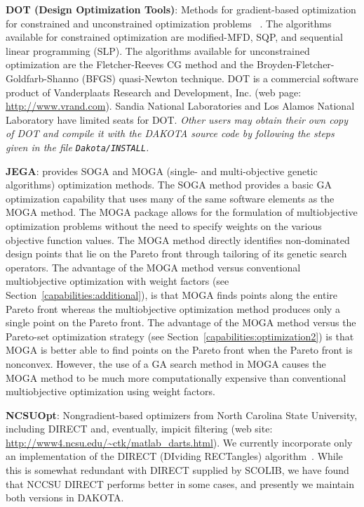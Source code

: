 \textbf{DOT (Design Optimization Tools)}: Methods for gradient-based
optimization for constrained and unconstrained optimization problems
~\cite{Van95}. The algorithms available for constrained optimization are
modified-MFD, SQP, and sequential linear programming (SLP). The
algorithms available for unconstrained optimization are the
Fletcher-Reeves CG method and the Broyden-Fletcher-Goldfarb-Shanno
(BFGS) quasi-Newton technique. DOT is a commercial software product of
Vanderplaats Research and Development, Inc. (web page:
\url{http://www.vrand.com}). Sandia National Laboratories and Los
Alamos National Laboratory have limited seats for DOT. \emph{Other
users may obtain their own copy of DOT and compile it with the DAKOTA
source code by following the steps given in the file {\tt Dakota/INSTALL}.}

\textbf{JEGA}: provides SOGA and MOGA (single- and multi-objective
genetic algorithms) optimization methods. The SOGA method provides a
basic GA optimization capability that uses many of the same software
elements as the MOGA method. The MOGA package allows for the
formulation of multiobjective optimization problems without the need
to specify weights on the various objective function values. The MOGA
method directly identifies non-dominated design points that lie on the
Pareto front through tailoring of its genetic search operators.  The
advantage of the MOGA method versus conventional multiobjective
optimization with weight factors (see
Section~\ref{capabilities:additional}), is that MOGA finds points
along the entire Pareto front whereas the multiobjective optimization
method produces only a single point on the Pareto front. The advantage
of the MOGA method versus the Pareto-set optimization strategy (see
Section~\ref{capabilities:optimization2}) is that MOGA is better able
to find points on the Pareto front when the Pareto front is
nonconvex. However, the use of a GA search method in MOGA causes the
MOGA method to be much more computationally expensive than
conventional multiobjective optimization using weight factors.


\textbf{NCSUOpt}: Nongradient-based optimizers from North Carolina
State University, including DIRECT and, eventually, impicit filtering
(web site: \url{http://www4.ncsu.edu/~ctk/matlab_darts.html}).  We
currently incorporate only an implementation of the DIRECT (DIviding
RECTangles) algorithm~\cite{Gab01}.  While this is somewhat redundant
with DIRECT supplied by SCOLIB, we have found that NCCSU DIRECT
performs better in some cases, and presently we maintain both versions
in DAKOTA.

